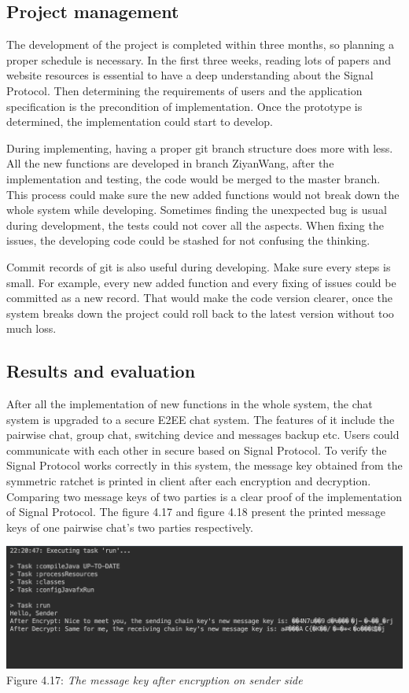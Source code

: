 \subsection{Project management}
The development of the project is completed within three months, so planning a proper schedule is necessary. In the first three weeks, reading lots of papers and website resources is essential to have a deep understanding about the Signal Protocol. Then determining the requirements of users and the application specification is the precondition of implementation. Once the prototype is determined, the implementation could start to develop.

During implementing, having a proper git branch structure does more with less. All the new functions are developed in branch ZiyanWang, after the implementation and testing, the code would be merged to the master branch. This process could make sure the new added functions would not break down the whole system while developing. Sometimes finding the unexpected bug is usual during development, the tests could not cover all the aspects. When fixing the issues, the developing code could be stashed for not confusing the thinking.

Commit records of git is also useful during developing. Make sure every steps is small. For example, every new added function and every fixing of issues could be committed as a new record. That would make the code version clearer, once the system breaks down the project could roll back to the latest version without too much loss.

\subsection{Results and evaluation}
After all the implementation of new functions in the whole system, the chat system is upgraded to a secure E2EE chat system. The features of it include the pairwise chat, group chat, switching device and messages backup etc. Users could communicate with each other in secure based on Signal Protocol. To verify the Signal Protocol works correctly in this system, the message key obtained from the symmetric ratchet is printed in client after each encryption and decryption. Comparing two message keys of two parties is a clear proof of the implementation of Signal Protocol. The figure 4.17 and figure 4.18 present the printed message keys of one pairwise chat's two parties respectively.

\begin{center}
\includegraphics[scale=.55]{../4-Implementation/resources/key-sender.png}\\
Figure 4.17: \textit{The message key after encryption on sender side}
\end{center}

